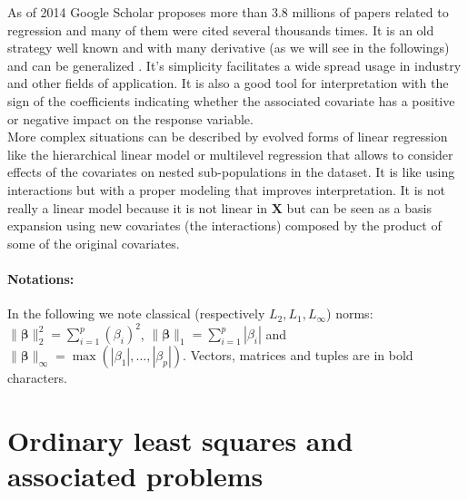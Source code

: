 \documentclass[12pt,a4paper]{report}
\begin{document}
		 As of 2014 Google Scholar proposes more than $3.8$ millions of papers related to regression and many of them were cited several thousands times. It is an old strategy well known and with many derivative (as we will see in the followings) and can be generalized 		 \cite{kiebel2003general,wickens2004general,nelder1972generalized,mccullagh1989generalized}. 
	It's simplicity facilitates a wide spread usage in industry and other fields of application. It is also a good tool for interpretation with the sign of the coefficients indicating whether the associated covariate has a positive or negative impact on the response variable. \\
	
	More complex situations can be described by evolved forms of linear regression like the hierarchical linear model \cite{raudenbush2002hierarchical,woltman2012introduction}  or  multilevel regression \cite{moerbeek2003comparison,maas2004robustness,hox1998multilevel} that allows to consider effects of the covariates on nested sub-populations in the dataset. It is like using interactions but with a proper modeling that improves interpretation. It is not really a linear model because it is not linear in $\boldsymbol{X}$ but can be seen as a basis expansion using new covariates (the interactions) composed by the product of some of the original covariates.
%			
%



\paragraph{Notations:}	
In the following we note classical (respectively $L_2,L_1,L_{\infty}$) norms: $\parallel\boldsymbol{\beta}\parallel_2^2=\sum_{i=1}^p(\beta_i)^2$, $\parallel\boldsymbol{\beta} \parallel_1=\sum_{i=1}^p|\beta_i| $ and $\parallel\boldsymbol{\beta} \parallel_{\infty}=\operatorname{max}(|\beta_1|,\dots,|\beta_p|)$. Vectors, matrices and tuples are in bold characters.
	\section{Ordinary least squares and associated problems}\label{sectionOLS}		%
\end{document}
